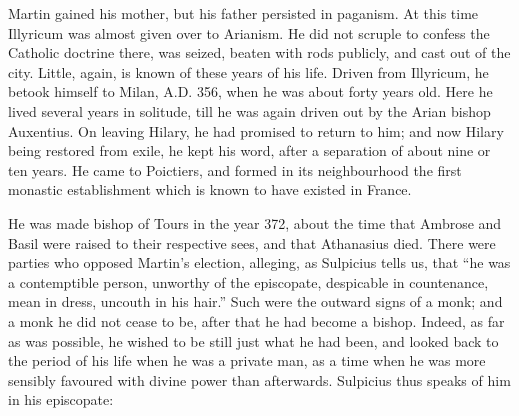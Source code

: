 Martin gained his mother, but his father persisted in paganism. At
this time Illyricum was almost given over to Arianism. He did not
scruple to confess the Catholic doctrine there, was seized, beaten
with rods publicly, and cast out of the city. Little, again, is known
of these years of his life. Driven from Illyricum, he betook himself
to Milan, A.D. 356, when he was about forty
years old. Here he lived several years in solitude, till he was again
driven out by the Arian bishop Auxentius. On leaving Hilary, he had
promised to return to him; and now Hilary being restored from exile,
he kept his word, after a separation of about nine or ten years. He
came to Poictiers, and formed in its neighbourhood the first monastic
establishment which is known to have existed in France.

He was made bishop of Tours in the year 372, about the time that
Ambrose and Basil were raised to their respective sees, and that
Athanasius died. There were parties who opposed Martin's election,
alleging, as Sulpicius tells us, that ``he was a contemptible
person, unworthy of the episcopate, despicable in countenance, mean in
dress, uncouth in his hair.'' Such were the outward signs of a
monk; and a monk he did not cease to be, after that he had become a
bishop. Indeed, as far as was possible, he wished to be still just
what he had been, and looked back to the period of his life when
he was a private man, as a time when he was more sensibly favoured
with divine power than afterwards. Sulpicius thus speaks of him in his
episcopate:

